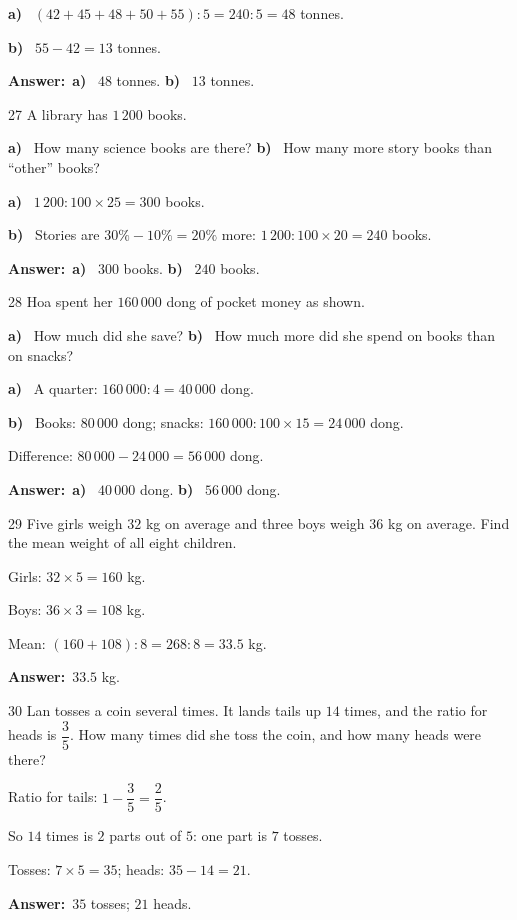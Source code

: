 \documentclass[11pt]{article}
\newif\ifsol \solfalse
\providecommand{\AnsWord}{Đáp số}
\newcommand{\dapso}[1]{\par\textbf{\AnsWord:}\ #1}
\newcommand{\probsol}[1]{%
  \begin{lrbox}{\solmeasure}\begin{minipage}{\dimexpr\linewidth-24pt\relax}#1\end{minipage}\end{lrbox}%
  \ifsol
    \begin{solbox}#1\end{solbox}%
  \else
    \setlength{\solht}{\dimexpr\ht\solmeasure+\dp\solmeasure+0.85cm\relax}%
    \ifdim\solht<1.35cm\setlength{\solht}{1.35cm}\fi
    \begin{tcolorbox}[colback=white,colframe=Line,boxrule=0.8pt,arc=5pt,
      left=8pt,right=8pt,top=4pt,bottom=4pt,height=\solht]{\footnotesize\color{Slate}\itshape\WorkWord}\end{tcolorbox}%
  \fi}
\newcommand{\pa}[1]{\textbf{#1)}\ }
\newcommand{\gap}{\vspace{0.3cm}}
\def\WorkWord{Your work:}
\def\AnsWord{Answer}
\begin{document}
\probsol{
\pa{a} $(42+45+48+50+55):5=240:5=48$ tonnes.\par
\pa{b} $55-42=13$ tonnes.
\dapso{\pa{a} $48$ tonnes. \pa{b} $13$ tonnes.}}
\gap
\needspace{7.5cm}
\begin{probbox}{27}{\relax}
A library has $1\,200$ books.
\begin{center}
\end{center}
\pa{a} How many science books are there? \quad \pa{b} How many more story books than ``other'' books?
\end{probbox}
\probsol{
\pa{a} $1\,200:100\times25=300$ books.\par
\pa{b} Stories are $30\%-10\%=20\%$ more: $1\,200:100\times20=240$ books.
\dapso{\pa{a} $300$ books. \pa{b} $240$ books.}}
\gap
\needspace{7.5cm}
\begin{probbox}{28}{\relax}
Hoa spent her $160\,000$ dong of pocket money as shown.
\begin{center}
\end{center}
\pa{a} How much did she save? \quad \pa{b} How much more did she spend on books than on snacks?
\end{probbox}
\probsol{
\pa{a} A quarter: $160\,000:4=40\,000$ dong.\par
\pa{b} Books: $80\,000$ dong; snacks: $160\,000:100\times15=24\,000$ dong.\par Difference: $80\,000-24\,000=56\,000$ dong.
\dapso{\pa{a} $40\,000$ dong. \pa{b} $56\,000$ dong.}}
\gap
\begin{probbox}{29}{\relax}
Five girls weigh $32$ kg on average and three boys weigh $36$ kg on average. Find the mean weight of all eight children.
\end{probbox}
\probsol{
Girls: $32\times5=160$ kg.\par Boys: $36\times3=108$ kg.\par Mean: $(160+108):8=268:8=33.5$ kg.
\dapso{$33.5$ kg.}}
\gap
\begin{probbox}{30}{\relax}
Lan tosses a coin several times. It lands tails up $14$ times, and the ratio for heads is $\dfrac35$. How many times did she toss the coin, and how many heads were there?
\end{probbox}
\probsol{
Ratio for tails: $1-\dfrac35=\dfrac25$.\par So $14$ times is $2$ parts out of $5$: one part is $7$ tosses.\par Tosses: $7\times5=35$; heads: $35-14=21$.
\dapso{$35$ tosses; $21$ heads.}}
\end{document}
